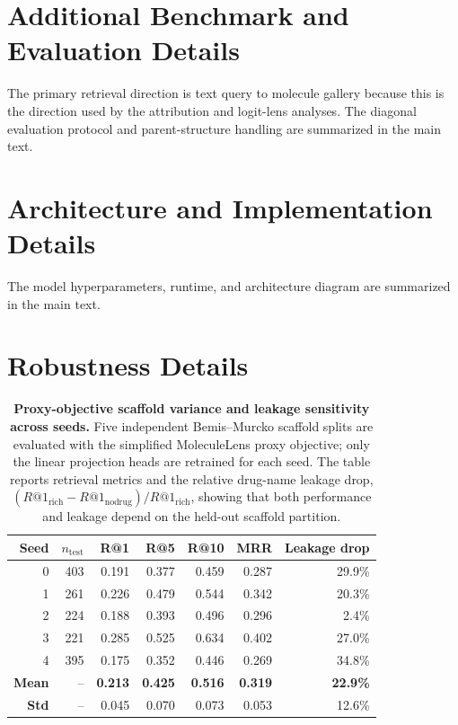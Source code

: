 \documentclass{article}
\begin{document}
{\setlength{\bibsep}{3pt}


}

\appendix

\section{Additional Benchmark and Evaluation Details}
\label{app:benchmark}

The primary retrieval direction is text query to molecule gallery because this is the direction used by the attribution and logit-lens analyses. The diagonal evaluation protocol and parent-structure handling are summarized in the main text.

\section{Architecture and Implementation Details}
\label{app:architecture}

The model hyperparameters, runtime, and architecture diagram are summarized in the main text.

\section{Robustness Details}
\label{app:robustness}

\begin{table}[!htbp]
\centering
\small
\caption{\textbf{Proxy-objective scaffold variance and leakage sensitivity across seeds.} Five independent Bemis--Murcko scaffold splits are evaluated with the simplified MoleculeLens proxy objective; only the linear projection heads are retrained for each seed. The table reports retrieval metrics and the relative drug-name leakage drop, $(R@1_\text{rich}-R@1_\text{nodrug})/R@1_\text{rich}$, showing that both performance and leakage depend on the held-out scaffold partition.}
\label{tab:multiseed}
\begin{tabular}{r r r r r r r}
\toprule
Seed & $n_\text{test}$ & R@1 & R@5 & R@10 & MRR & Leakage drop \\
\midrule
0 & 403 & 0.191 & 0.377 & 0.459 & 0.287 & 29.9\% \\
1 & 261 & 0.226 & 0.479 & 0.544 & 0.342 & 20.3\% \\
2 & 224 & 0.188 & 0.393 & 0.496 & 0.296 &  2.4\% \\
3 & 221 & 0.285 & 0.525 & 0.634 & 0.402 & 27.0\% \\
4 & 395 & 0.175 & 0.352 & 0.446 & 0.269 & 34.8\% \\
\midrule
\textbf{Mean} & -- & \textbf{0.213} & \textbf{0.425} & \textbf{0.516} & \textbf{0.319} & \textbf{22.9\%} \\
\textbf{Std}  & -- & 0.045 & 0.070 & 0.073 & 0.053 & 12.6\% \\
\bottomrule
\end{tabular}
\end{table}
\end{document}
